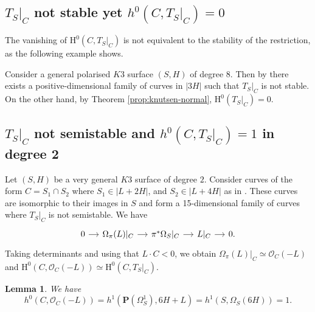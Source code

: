 \documentclass[a4paper,12pt,twoside,reqno]{amsart}
\numberwithin{equation}{section}
\theoremstyle{plain}
\newtheorem{lemma}[theorem]{Lemma}
\theoremstyle{definition}
\newcommand{\PP}{\mathbf{P}}
\newcommand{\tsc}{T_S|_C}
\newcommand{\HH}{\mathrm{H}}
\newcommand{\OO}{\mathscr{O}}
\theoremstyle{plain}
\theoremstyle{definition}
\begin{document}
\subsection{\texorpdfstring{$T_S|_C$ not stable yet $h^0(C,T_S|_C)=0$}{Unstable restriction with no sections}}\label{subsection:notstableh0}

The vanishing of $\HH^0(C,T_S|_C)$ is not equivalent to the stability of the restriction, as the following example shows.

Consider a general polarised $K3$ surface $(S,H)$ of degree $8$. Then by \cite[Theorem A]{GO} there exists a positive-dimensional family of curves in $|3H|$ such that $T_S|_C$ is not stable.  On the other hand, by Theorem \ref{prop:knutsen-normal}, $\HH^0(\tsc)=0$. 


\subsection{\texorpdfstring{$T_S|_C$ not semistable and $h^0(C,T_S|_C)=1$ in degree 2}{Non-semistable restriction with one section in degree 2}}\label{sec:stability-degree2}
Let $(S,H)$ be a very general $K3$ surface of degree $2$. Consider curves of the form $C=S_1 \cap S_2$ where $S_1 \in |L+2H|$, and $S_2 \in |L+4H|$ as in \cite[Proposition~4.1]{GO}. These curves are isomorphic to their images in $S$ and form a 15-dimensional family of curves where $T_S|_C$ is not semistable. We have
\[
\begin{tikzcd}[column sep=small]
0 \arrow[r] & \Omega_\pi(L)|_C \arrow[r]
& \pi^*\Omega_S|_C \arrow[r] & L|_C \arrow[r] & 0.
\end{tikzcd}
\]
Taking determinants and using that $L\cdot C<0$, we obtain
$\Omega_{\pi}(L)|_C\simeq\OO_C(-L)$ and
$\HH^0(C,\OO_C(-L))\simeq\HH^0(C,\tsc)$. 
\begin{lemma}\label{lem:h0degree2} We have
\begin{equation*}
h^0(C,\OO_C(-L))=h^1(\PP(\Omega^1_S),6H+L)=h^1(S,\Omega_S(6H))=1.
\end{equation*}
\end{lemma}
\end{document}
